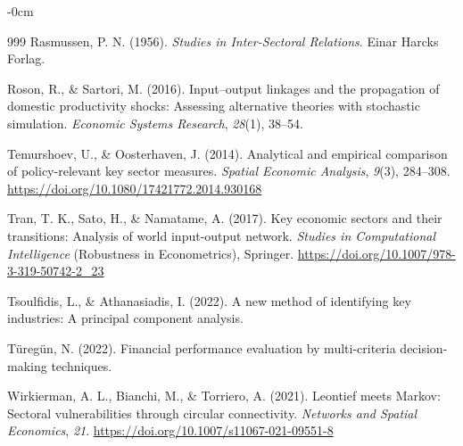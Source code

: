 \documentclass[journal,article,submit,pdftex,moreauthors]{Definitions/mdpi}
\begin{document}
\begin{adjustwidth}{-\extralength}{0cm}
{\begin{thebibliography}{999}
Rasmussen, P. N. (1956). \textit{Studies in Inter-Sectoral Relations}. Einar Harcks Forlag.

Roson, R., \& Sartori, M. (2016). Input--output linkages and the propagation of domestic productivity shocks: Assessing alternative theories with stochastic simulation. \textit{Economic Systems Research}, \textit{28}(1), 38--54.

Temurshoev, U., \& Oosterhaven, J. (2014). Analytical and empirical comparison of policy-relevant key sector measures. \textit{Spatial Economic Analysis}, \textit{9}(3), 284--308. \url{https://doi.org/10.1080/17421772.2014.930168}

Tran, T. K., Sato, H., \& Namatame, A. (2017). Key economic sectors and their transitions: Analysis of world input-output network. \textit{Studies in Computational Intelligence} (Robustness in Econometrics), Springer. \url{https://doi.org/10.1007/978-3-319-50742-2\_23}

Tsoulfidis, L., \& Athanasiadis, I. (2022). A new method of identifying key industries: A principal component analysis.

Türegün, N. (2022). Financial performance evaluation by multi-criteria decision-making techniques.

Wirkierman, A. L., Bianchi, M., \& Torriero, A. (2021). Leontief meets Markov: Sectoral vulnerabilities through circular connectivity. \textit{Networks and Spatial Economics}, \textit{21}. \url{https://doi.org/10.1007/s11067-021-09551-8}
\end{thebibliography}
}{}

%


\end{adjustwidth}
\end{document}
